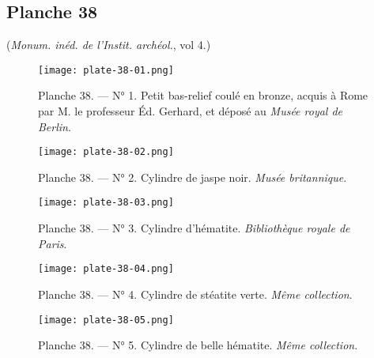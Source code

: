 \documentclass[a4paper, 11pt, oneside, polutonikogreek, french]{article}
\begin{document}
\subsection{Planche 38}
\begin{center}
(\emph{Monum. inéd. de l'Instit. archéol.}, vol 4.)
\end{center}
\vspace*{\fill}
\clearpage
\pagestyle{fancy}
\fancyhf{}
\cfoot{{\thepage}}
\vspace*{\fill}
\begin{figure}[H]
\centering
\texttt{[image: plate-38-01.png]}
\caption{Planche 38. --- N° 1. Petit bas-relief coulé en bronze, acquis à Rome par M. le professeur Éd. Gerhard, et déposé au \emph{Musée royal de Berlin}.}
\end{figure}
\vspace*{\fill}
\clearpage
\vspace*{\fill}
\begin{figure}[H]
\centering
\texttt{[image: plate-38-02.png]}
\caption{Planche 38. --- N° 2. Cylindre de jaspe noir. \emph{Musée britannique}.}
\end{figure}
\vspace*{\fill}
\clearpage
\vspace*{\fill}
\begin{figure}[H]
\centering
\texttt{[image: plate-38-03.png]}
\caption{Planche 38. --- N° 3. Cylindre d'hématite. \emph{Bibliothèque royale de Paris}.}
\end{figure}
\vspace*{\fill}
\clearpage
\vspace*{\fill}
\begin{figure}[H]
\centering
\texttt{[image: plate-38-04.png]}
\caption{Planche 38. --- N° 4. Cylindre de stéatite verte. \emph{Même collection}.}
\end{figure}
\vspace*{\fill}
\clearpage
\vspace*{\fill}
\begin{figure}[H]
\centering
\texttt{[image: plate-38-05.png]}
\caption{Planche 38. --- N° 5. Cylindre de belle hématite. \emph{Même collection}.}
\end{figure}
\vspace*{\fill}
\clearpage
\vspace*{\fill}
\end{document}

